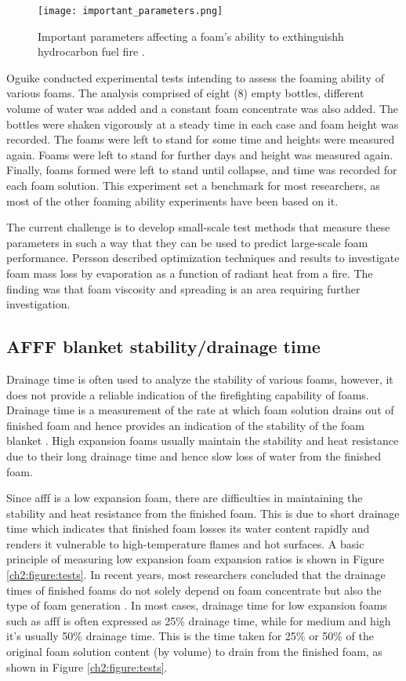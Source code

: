 \begin{figure}[H]
    \centering
    \texttt{[image: important\_parameters.png]}
    \caption{Important parameters affecting a foam's ability to exthinguishh hydrocarbon fuel fire \cite{scheffey1995evaluating}.}
    \label{ch2:figure:parameters}
\end{figure}

Oguike \cite{oguike2013study} conducted experimental tests intending to assess the foaming ability of various foams. The analysis comprised of eight (8) empty bottles, different volume of water was added and a constant foam concentrate was also added. The bottles were shaken vigorously at a steady time in each case and foam height was recorded. The foams were left to stand for some time and heights were measured again. Foams were left to stand for further days and height was measured again. Finally, foams formed were left to stand until collapse, and time was recorded for each foam solution. This experiment set a benchmark for most researchers, as most of the other foaming ability experiments have been based on it.

The current challenge is to develop small-scale test methods that measure these parameters in such a way that they can be used to predict large-scale foam performance. Persson \cite{persson1992fire} described optimization techniques and results to investigate foam mass loss by evaporation as a function of radiant heat from a fire. The finding was that foam viscosity and spreading is an area requiring further investigation. 

\subsection{AFFF blanket stability/drainage time}
Drainage time is often used to analyze the stability of various foams, however, it does not provide a reliable indication of the firefighting capability of foams. Drainage time is a measurement of the rate at which foam solution drains out of finished foam and hence provides an indication of the stability of the foam blanket \cite{aamodt2020review}. High expansion foams usually maintain the stability and heat resistance due to their long drainage time and hence slow loss of water from the finished foam. 

Since \acrshort{afff} is a low expansion foam, there are difficulties in maintaining the stability and heat resistance from the finished foam. This is due to short drainage time which indicates that finished foam losses its water content rapidly and renders it vulnerable to high-temperature flames and hot surfaces. A basic principle of measuring low expansion foam expansion ratios is shown in Figure \ref{ch2:figure:tests}. In recent years, most researchers concluded that the drainage times of finished foams do not solely depend on foam concentrate but also the type of foam generation \cite{martin2012fire}. In most cases, drainage time for low expansion foams such as \acrshort{afff} is often expressed as 25\% drainage time, while for medium and high it's usually 50\% drainage time. This is the time taken for 25\% or 50\% of the original foam solution content (by volume) to drain from the finished foam, as shown in Figure \ref{ch2:figure:tests}.

